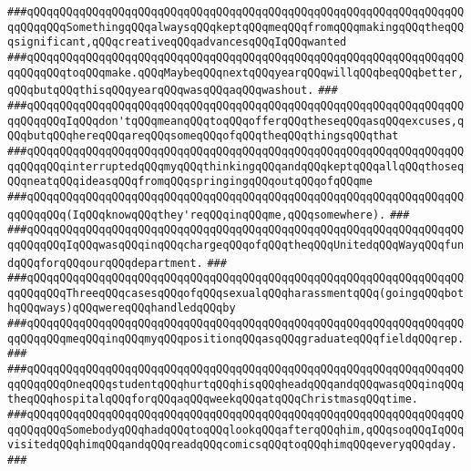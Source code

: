 \verb|###qQQqqQQqqQQqqQQqqQQqqQQqqQQqqQQqqQQqqQQqqQQqqQQqqQQqqQQqqQQqqQQqqQQqqQQqqQQqSomethingqQQqalwaysqQQqkeptqQQqmeqQQqfromqQQqmakingqQQqtheqQQqsignificant,qQQqcreativeqQQqadvancesqQQqIqQQqwanted|\newline
\verb|###qQQqqQQqqQQqqQQqqQQqqQQqqQQqqQQqqQQqqQQqqQQqqQQqqQQqqQQqqQQqqQQqqQQqqQQqqQQqtoqQQqmake.qQQqMaybeqQQqnextqQQqyearqQQqwillqQQqbeqQQqbetter,qQQqbutqQQqthisqQQqyearqQQqwasqQQqaqQQqwashout.|\newline
\verb|###|\newline
\verb|###qQQqqQQqqQQqqQQqqQQqqQQqqQQqqQQqqQQqqQQqqQQqqQQqqQQqqQQqqQQqqQQqqQQqqQQqqQQqIqQQqdon'tqQQqmeanqQQqtoqQQqofferqQQqtheseqQQqasqQQqexcuses,qQQqbutqQQqhereqQQqareqQQqsomeqQQqofqQQqtheqQQqthingsqQQqthat|\newline
\verb|###qQQqqQQqqQQqqQQqqQQqqQQqqQQqqQQqqQQqqQQqqQQqqQQqqQQqqQQqqQQqqQQqqQQqqQQqqQQqinterruptedqQQqmyqQQqthinkingqQQqandqQQqkeptqQQqallqQQqthoseqQQqneatqQQqideasqQQqfromqQQqspringingqQQqoutqQQqofqQQqme|\newline
\verb|###qQQqqQQqqQQqqQQqqQQqqQQqqQQqqQQqqQQqqQQqqQQqqQQqqQQqqQQqqQQqqQQqqQQqqQQqqQQq(IqQQqknowqQQqthey'reqQQqinqQQqme,qQQqsomewhere).|\newline
\verb|###|\newline
\verb|###qQQqqQQqqQQqqQQqqQQqqQQqqQQqqQQqqQQqqQQqqQQqqQQqqQQqqQQqqQQqqQQqqQQqqQQqqQQqIqQQqwasqQQqinqQQqchargeqQQqofqQQqtheqQQqUnitedqQQqWayqQQqfundqQQqforqQQqourqQQqdepartment.|\newline
\verb|###|\newline
\verb|###qQQqqQQqqQQqqQQqqQQqqQQqqQQqqQQqqQQqqQQqqQQqqQQqqQQqqQQqqQQqqQQqqQQqqQQqqQQqThreeqQQqcasesqQQqofqQQqsexualqQQqharassmentqQQq(goingqQQqbothqQQqways)qQQqwereqQQqhandledqQQqby|\newline
\verb|###qQQqqQQqqQQqqQQqqQQqqQQqqQQqqQQqqQQqqQQqqQQqqQQqqQQqqQQqqQQqqQQqqQQqqQQqqQQqmeqQQqinqQQqmyqQQqpositionqQQqasqQQqgraduateqQQqfieldqQQqrep.|\newline
\verb|###|\newline
\verb|###qQQqqQQqqQQqqQQqqQQqqQQqqQQqqQQqqQQqqQQqqQQqqQQqqQQqqQQqqQQqqQQqqQQqqQQqqQQqOneqQQqstudentqQQqhurtqQQqhisqQQqheadqQQqandqQQqwasqQQqinqQQqtheqQQqhospitalqQQqforqQQqaqQQqweekqQQqatqQQqChristmasqQQqtime.|\newline
\verb|###qQQqqQQqqQQqqQQqqQQqqQQqqQQqqQQqqQQqqQQqqQQqqQQqqQQqqQQqqQQqqQQqqQQqqQQqqQQqSomebodyqQQqhadqQQqtoqQQqlookqQQqafterqQQqhim,qQQqsoqQQqIqQQqvisitedqQQqhimqQQqandqQQqreadqQQqcomicsqQQqtoqQQqhimqQQqeveryqQQqday.|\newline
\verb|###|\newline
